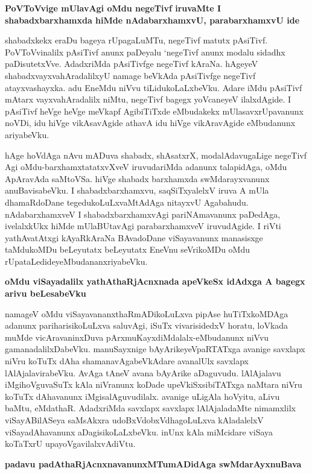 {\bigskip
\noindent
{\large\bf PoVToVvige mUlavAgi oMdu negeTivf iruvaMte I shabadxbarxhamxda hiMde nAdabarxhamxvU, parabarxhamxvU ide}}\label{page199}
\medskip

\noindent
shabadxkekx eraDu bageya rUpagaLuMTu, negeTivf matutx pAsiTivf. PoVToVvinalilx pAsiTivf anunx paDeyalu `negeTivf anunx modalu sidadhx paDisutetxVve. AdadxriMda pAsiTivfge negeTivf kAraNa. hAgeyeV shabadxvayxvahAradalilxyU namage beVkAda pAsiTivfge negeTivf atayxvashayxka. adu EneMdu niVvu tiLidukoLaLxbeVku. Adare iMdu pAsiTivf mAtarx vayxvahAradalilx niMtu, negeTivf bagegx yoVcaneyeV ilalxdAgide. I pAsiTivf heVge heVge meVkapf AgibiTiTxde eMbudakekx mUlasavxrUpavanunx noVDi, idu hiVge vikAsavAgide athavA idu hiVge vikAravAgide eMbudanunx ariyabeVku. 

hAge hoVdAga nAvu mADuva shabadx, shAsatxrX, modalAdavugaLige negeTivf Agi oMdu-barxhamxtatatxvXveV iruvudariMda adanunx talapidAga, oMdu ApAravAda saMtoVSa. hiVge shabadx barxhamxda swMdarayxvanunx anuBavisabeVku. I shabadxbarxhamxvu, saqSiTxyalelxV iruva A mUla dhamaRdoDane tegedukoLuLxvaMtAdAga nitayxvU Agabahudu. nAdabarxhamxveV I shabadxbarxhamxvAgi pariNAmavanunx paDedAga, ivelalxkUkx hiMde mUlaBUtavAgi parabarxhamxveV iruvudAgide. I riVti yathAvatAtxgi kAyaRkAraNa BAvadoDane viSayavanunx manasisxge taMdukoMDu beLeyutatx beLeyutatx EneVnu seVrikoMDu oMdu rUpataLedideyeMbudananxriyabeVku.

{\bigskip
\noindent
{\large\bf oMdu viSayadalilx yathAthaRjAcnxnada apeVkeSx idAdxga A bagegx arivu beLesabeVku}}\label{page200}
\medskip

\noindent
namageV oMdu viSayavananxthaRmADikoLuLxva pipAse huTiTxkoMDAga adanunx pariharisikoLuLxva saluvAgi, iSuTx vivarisidedxV horatu, loVkada muMde vicAravaninxDuva pArxmuKayxdiMdalalx-eMbudanunx niVvu gamanadalilxDabeVku. manuSayxnige bAyArikeyeVpaRTATxga avanige savxlapx niVru koTuTx dAha shamanavAgabeVkAdare avanalUlx savxlapx lAlAjalavirabeVku. AvAga tAneV avana bAyArike aDaguvudu. lAlAjalavu iMgihoVguvaSuTx kAla niVranunx koDade upeVkiSxsibiTATxga naMtara niVru koTuTx dAhavanunx iMgisalAguvudilalx. avanige uLigAla hoVyitu, aLivu baMtu, eMdathaR. AdadxriMda savxlapx savxlapx lAlAjaladaMte nimamxlilx viSayABilASeya saMsAkxra udoBxVdobxVdhagoLuLxva kAladalelxV viSayadAhavanunx aDagisikoLaLxbeVku. inUnx kAla miMcidare viSaya koTaTxrU upayoVgavilalxvAdiVtu.

\eject

{\bigskip
\noindent
{\large\bf padavu padAthaRjAcnxnavanunxMTumADidAga swMdarAyxnuBava}}\label{page200b}
\medskip

